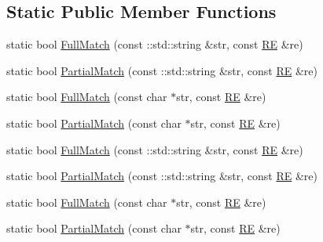 \subsection*{\-Static \-Public \-Member \-Functions}
\begin{DoxyCompactItemize}
\item 
static bool \hyperlink{classtesting_1_1internal_1_1RE_a229557f6103061f358082e73d56cf006}{\-Full\-Match} (const \-::std\-::string \&str, const \hyperlink{classtesting_1_1internal_1_1RE}{\-R\-E} \&re)
\item 
static bool \hyperlink{classtesting_1_1internal_1_1RE_aeb7290a6ea2eb9be0cb34db07470fb10}{\-Partial\-Match} (const \-::std\-::string \&str, const \hyperlink{classtesting_1_1internal_1_1RE}{\-R\-E} \&re)
\item 
static bool \hyperlink{classtesting_1_1internal_1_1RE_ae79a9c89b39e92f15dd526fb05a52e36}{\-Full\-Match} (const char $\ast$str, const \hyperlink{classtesting_1_1internal_1_1RE}{\-R\-E} \&re)
\item 
static bool \hyperlink{classtesting_1_1internal_1_1RE_aaa6613a8f30daea1d3c9fd47bcd1ad10}{\-Partial\-Match} (const char $\ast$str, const \hyperlink{classtesting_1_1internal_1_1RE}{\-R\-E} \&re)
\item 
static bool \hyperlink{classtesting_1_1internal_1_1RE_a229557f6103061f358082e73d56cf006}{\-Full\-Match} (const \-::std\-::string \&str, const \hyperlink{classtesting_1_1internal_1_1RE}{\-R\-E} \&re)
\item 
static bool \hyperlink{classtesting_1_1internal_1_1RE_aeb7290a6ea2eb9be0cb34db07470fb10}{\-Partial\-Match} (const \-::std\-::string \&str, const \hyperlink{classtesting_1_1internal_1_1RE}{\-R\-E} \&re)
\item 
static bool \hyperlink{classtesting_1_1internal_1_1RE_ae79a9c89b39e92f15dd526fb05a52e36}{\-Full\-Match} (const char $\ast$str, const \hyperlink{classtesting_1_1internal_1_1RE}{\-R\-E} \&re)
\item 
static bool \hyperlink{classtesting_1_1internal_1_1RE_aaa6613a8f30daea1d3c9fd47bcd1ad10}{\-Partial\-Match} (const char $\ast$str, const \hyperlink{classtesting_1_1internal_1_1RE}{\-R\-E} \&re)
\end{DoxyCompactItemize}
